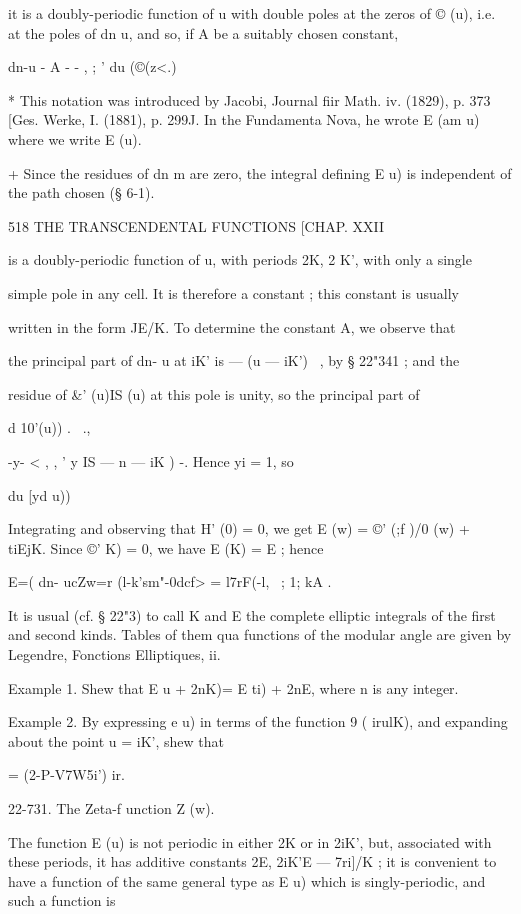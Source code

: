 it is a doubly-periodic function of u with double poles at the zeros of © (u), 
i.e. at the poles of dn u, and so, if A be a suitably chosen constant, 

dn-u - A - -    , ; ' 
du (©(z<.) 

* This notation was introduced by Jacobi, Journal fiir Math. iv. (1829), p. 373 [Ges. Werke, 
I. (1881), p. 299J. In the Fundamenta Nova, he wrote E (am u) where we write E (u). 

+ Since the residues of dn  m are zero, the integral defining E  u) is independent of the path 
chosen (§ 6-1). 



518 THE TRANSCENDENTAL FUNCTIONS [CHAP. XXII 

is a doubly-periodic function of u, with periods 2K, 2 K', with only a single 

simple pole in any cell. It is therefore a constant ; this constant is usually 

written in the form JE/K. To determine the constant A, we observe that 

the principal part of dn- u at iK' is — (u — iK')~ , by § 22"341 ; and the 

residue of \&' (u)IS (u) at this pole is unity, so the principal part of 

d 10'(u)) . \ ., 

-y- <  , , ' y IS —  n — iK ) -. Hence yi = 1, so 

du [yd u)) 

Integrating and observing that H' (0) = 0, we get 
E (w) = ©' (;f )/0 (w) + tiEjK. 
Since ©'  K) = 0, we have E (K) = E ; hence 

E=( dn- ucZw=r (l-k'sm"-0dcf> = l7rF(-l, ~; 1; kA . 

It is usual (cf. § 22"3) to call K and E the complete elliptic integrals of the 
first and second kinds. Tables of them qua functions of the modular angle 
are given by Legendre, Fonctions Elliptiques, ii. 

Example 1. Shew that E  u + 2nK)= E ti) + 2nE, where n is any integer. 

Example 2. By expressing e u) in terms of the function 9 ( irulK), and expanding 
about the point u = iK', shew that 

 = (2-P-V7W5i') ir. 

22-731. The Zeta-f unction Z (w). 

The function E (u) is not periodic in either 2K or in 2iK', but, associated 
with these periods, it has additive constants 2E,  2iK'E — 7ri]/K ; it is 
convenient to have a function of the same general type as E u) which is 
singly-periodic, and such a function is 

